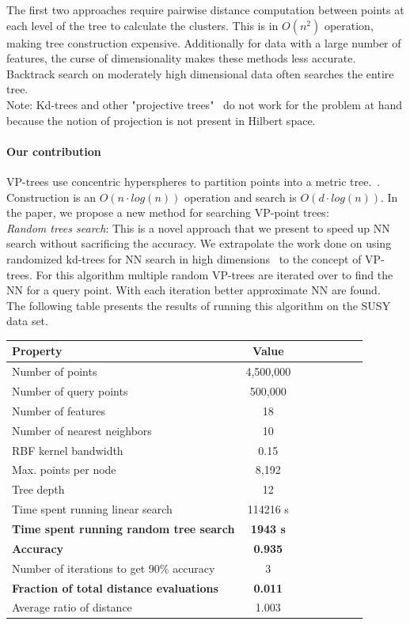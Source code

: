 \documentclass[11pt]{article}
\begin{document}
The first two approaches require pairwise distance computation between points at each level of the tree to calculate the clusters. This is in $O(n^2)$ operation, making tree construction expensive. Additionally for data with a large number of features, the curse of dimensionality makes these methods less accurate. Backtrack search on moderately high dimensional data often searches the entire tree.~\cite{Marimont79}
\\Note: Kd-trees and other "projective trees"~\cite{Nayar08} do not work for the problem at hand because the notion of projection is not present in Hilbert space.

\paragraph*{Our contribution} VP-trees use concentric hyperspheres to partition points into a metric tree.~\cite{Yianilos93}. Construction is an $O(n \cdot log(n))$ operation and search is $O(d \cdot log(n))$. In the paper, we propose a new method for searching VP-point trees:
\\
\emph{Random trees search}: This is a novel approach that we present to speed up NN search without sacrificing the accuracy. We extrapolate the work done on using randomized kd-trees for NN search in high dimensions~\cite{Dasgupta15} to the concept of VP-trees. For this algorithm multiple random VP-trees are iterated over to find the NN for a query point. With each iteration better approximate NN are found.
\\
\pagebreak
The following table presents the results of running this algorithm on the SUSY data set.~\cite{Whiteson2014}
\begin{center}
\begin{tabular}{l*{6}{c}r} Property & Value \\ 
\hline 
Number of points & 4,500,000 \\ 
Number of query points & 500,000 \\ 
Number of features & 18 \\ 
Number of nearest neighbors & 10 \\ 
RBF kernel bandwidth & 0.15 \\
Max. points per node & 8,192 \\
Tree depth & 12 \\
Time spent running linear search & 114216 s \\
\textbf{Time spent running random tree search} & \textbf{1943 s} \\
\textbf{Accuracy} & \textbf{0.935} \\
Number of iterations to get 90\% accuracy & 3 \\
\textbf{Fraction of total distance evaluations} & \textbf{0.011 }\\
Average ratio of distance & 1.003 \\
\end{tabular}
 \label{tab:results}
\end{center}
\end{document}

